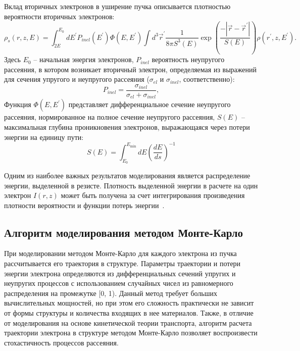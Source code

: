 Вклад вторичных электронов в уширение пучка описывается плотностью вероятности вторичных электронов:
\begin{equation} \label{eq:Boltzman_13_0}
	\rho_s(r, z, E)=\int_{2 E}^{E_0} d E^{\prime} P_{inel}\left(E^{\prime}\right) \Phi\left(E, E^{\prime}\right) \int d^3 \vec{r}^{\prime} \frac{1}{8 \pi S^3(E)} \exp \left(\frac{-\left|\vec{r}-\vec{r}^{\prime}\right|}{S(E)}\right) \rho\left(r^{\prime}, z, E^{\prime}\right).
\end{equation}
Здесь $E_0$ -- начальная энергия электронов, $P_{inel}$ вероятность неупругого рассеяния, в котором возникает вторичный электрон, определяемая из выражений для сечения упругого и неупругого рассеяния ($\sigma_{el}$ и $\sigma_{inel}$, соответственно):
\begin{equation} \label{eq:Boltzman_13}
	P_{inel}=\frac{\sigma_{inel}}{\sigma_{el}+\sigma_{inel}},
\end{equation}
Функция $\Phi\left(E, E^{\prime}\right)$ представляет дифференциальное сечение неупругого рассеяния, нормированное на полное сечение неупругого рассеяния, $S(E)$ -- максимальная глубина проникновения электронов, выражающаяся через потери энергии на единицу пути:
\begin{equation} \label{eq:Boltzman_14}
	S(E)=\int_{E_0}^{E_{\min }} d E\left(\frac{d E}{d s}\right)^{-1}
\end{equation}

Одним из наиболее важных результатов моделирования является распределение энергии, выделенной в резисте. Плотность выделенной энергии в расчете на один электрон $I(r,z)$ может быть получена за счет интегрирования произведения плотности вероятности и функции потерь энергии~\cite{ME_rev_64}.


\subsection{Алгоритм моделирования методом Монте-Карло}
При моделировании методом Монте-Карло для каждого электрона из пучка рассчитывается его траектория в структуре. Параметры траектории и потери энергии электрона определяются из дифференциальных сечений упругих и неупругих процессов с использованием случайных чисел из равномерного распределения на промежутке [0, 1). Данный метод требует больших вычислительных мощностей, но при этом его сложность практически не зависит от формы структуры и количества входящих в нее материалов. Также, в отличие от моделирования на основе кинетической теории транспорта, алгоритм расчета траектории электрона в структуре методом Монте-Карло позволяет воспроизвести стохастичность процессов рассеяния.

